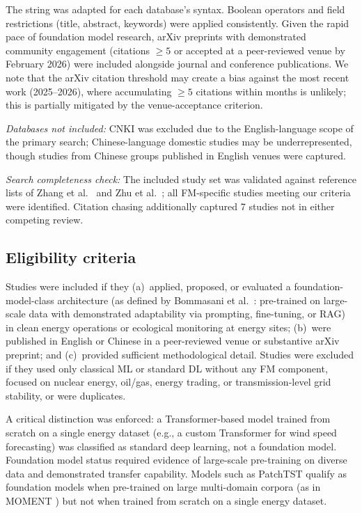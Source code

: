 \documentclass[preprint,12pt]{elsarticle}
\begin{document}
The string was adapted for each database's syntax. Boolean operators and field restrictions (title, abstract, keywords) were applied consistently. Given the rapid pace of foundation model research, arXiv preprints with demonstrated community engagement (citations $\geq 5$ or accepted at a peer-reviewed venue by February 2026) were included alongside journal and conference publications. We note that the arXiv citation threshold may create a bias against the most recent work (2025--2026), where accumulating $\geq 5$ citations within months is unlikely; this is partially mitigated by the venue-acceptance criterion.

\textit{Databases not included:} CNKI was excluded due to the English-language scope of the primary search; Chinese-language domestic studies may be underrepresented, though studies from Chinese groups published in English venues were captured.

\textit{Search completeness check:} The included study set was validated against reference lists of Zhang et al.\ \cite{zhang2025deep_generative_energy} and Zhu et al.\ \cite{zhu2024generalist_energy_ai}; all FM-specific studies meeting our criteria were identified. Citation chasing additionally captured 7 studies not in either competing review.

\subsection{Eligibility criteria}
\label{subsec:eligibility}

{ Studies were included if they (a)~applied, proposed, or evaluated a foundation-model-class architecture (as defined by Bommasani et al.\ \cite{bommasani2021opportunities}: pre-trained on large-scale data with demonstrated adaptability via prompting, fine-tuning, or RAG) in clean energy operations or ecological monitoring at energy sites; (b)~were published in English or Chinese in a peer-reviewed venue or substantive arXiv preprint; and (c)~provided sufficient methodological detail. Studies were excluded if they used only classical ML or standard DL without any FM component, focused on nuclear energy, oil/gas, energy trading, or transmission-level grid stability, or were duplicates.\par}

A critical distinction was enforced: a Transformer-based model trained from scratch on a single energy dataset (e.g., a custom Transformer for wind speed forecasting) was classified as standard deep learning, not a foundation model. Foundation model status required evidence of large-scale pre-training on diverse data and demonstrated transfer capability. Models such as PatchTST \cite{nie2023patchtst} qualify as foundation models when pre-trained on large multi-domain corpora (as in MOMENT \cite{goswami2024moment}) but not when trained from scratch on a single energy dataset.
\end{document}
